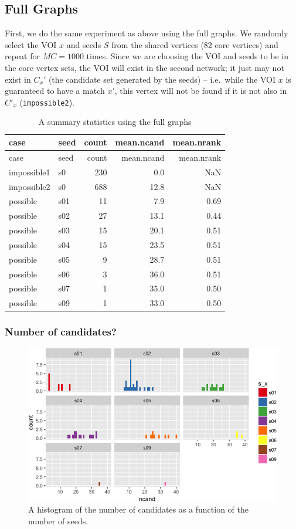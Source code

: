 \documentclass[]{article}
\begin{document}
\subsection{Full Graphs}\label{full-graphs}

First, we do the same experiment as above using the full graphs. We
randomly select the VOI \(x\) and seeds \(S\) from the shared vertices
(82 core vertices) and repeat for \(MC=1000\) times. Since we are
choosing the VOI and seeds to be in the core vertex sets, the VOI will
exist in the second network; it just may not exist in \(C_x'\) (the
candidate set generated by the seeds) -- i.e.~while the VOI \(x\) is
guaranteed to have a match \(x'\), this vertex will not be found if it
is not also in \(C'_x\) (\texttt{impossible2}).

\begin{longtable}[]{@{}llrrr@{}}
\caption{A summary statistics using the full graphs}\tabularnewline
\toprule
case & seed & count & mean.ncand & mean.nrank\tabularnewline
\midrule
\endfirsthead
\toprule
case & seed & count & mean.ncand & mean.nrank\tabularnewline
\midrule
\endhead
impossible1 & s0 & 230 & 0.0 & NaN\tabularnewline
impossible2 & s0 & 688 & 12.8 & NaN\tabularnewline
possible & s01 & 11 & 7.9 & 0.69\tabularnewline
possible & s02 & 27 & 13.1 & 0.44\tabularnewline
possible & s03 & 15 & 20.1 & 0.51\tabularnewline
possible & s04 & 15 & 23.5 & 0.51\tabularnewline
possible & s05 & 9 & 28.7 & 0.51\tabularnewline
possible & s06 & 3 & 36.0 & 0.51\tabularnewline
possible & s07 & 1 & 35.0 & 0.50\tabularnewline
possible & s09 & 1 & 33.0 & 0.50\tabularnewline
\bottomrule
\end{longtable}

\subsubsection{Number of candidates?}\label{number-of-candidates-1}

\begin{figure}
\centering
\includegraphics{vn_files/figure-latex/cand2-1.png}
\caption{A histogram of the number of candidates as a function of the
number of seeds.}
\end{figure}
\end{document}

